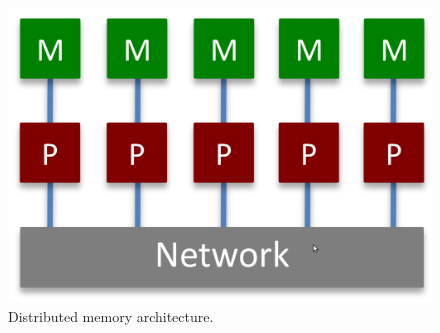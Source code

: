 \begin{figure}
\centering
\caption{Distributed memory architecture.}
\label{fig:distribuiteMemory}
\setlength{\fboxrule}{1pt}%
\includegraphics[scale=0.25]{./images/distribuitedMemory}
\end{figure}

